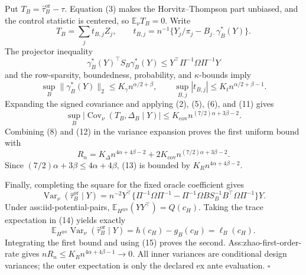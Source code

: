 Put \(T_B=\widehat\tau_B^{\mathrm{or}}-\tau\).  Equation (3) makes the Horvitz--Thompson part unbiased, and the control statistic is centered, so \(\mathbb E_\nu T_B=0\).  Write
\[
T_B=\sum_jt_{B,j}Z_j,
\qquad
t_{B,j}=n^{-1}\{Y_j/\pi_j-B_{j\cdot}\gamma_B^*(Y)\}.
\tag{9}
\]
The projector inequality
\[
\gamma_B^*(Y)^\top S_B\gamma_B^*(Y)
\le Y^\top\Pi^{-1}\Omega\Pi^{-1}Y
\tag{10}
\]
and the row-sparsity, boundedness, probability, and \(\kappa\)-bounds imply
\[
\sup_B\lVert\gamma_B^*(Y)\rVert_2\le K_\gamma n^{\alpha/2+\beta},
\qquad
\sup_{B,j}|t_{B,j}|\le K_tn^{\alpha/2+\beta-1}.
\tag{11}
\]
Expanding the signed covariance and applying (2), (5), (6), and (11) gives
\[
\sup_B|\operatorname{Cov}_\nu(T_B,\Delta_B\mid Y)|
\le K_{\mathrm{cov}}n^{(7/2)\alpha+3\beta-2}.
\tag{12}
\]
Combining (8) and (12) in the variance expansion proves the first uniform bound with
\[
R_n=K_\Delta n^{4\alpha+4\beta-2}
+2K_{\mathrm{cov}}n^{(7/2)\alpha+3\beta-2}.
\tag{13}
\]
Since \((7/2)\alpha+3\beta\le4\alpha+4\beta\), (13) is bounded by \(K_Rn^{4\alpha+4\beta-2}\).

Finally, completing the square for the fixed oracle coefficient gives
\[
\operatorname{Var}_\nu(\widehat\tau_B^{\mathrm{or}}\mid Y)
=n^{-2}Y^\top\{\Pi^{-1}\Omega\Pi^{-1}
-\Pi^{-1}\Omega BS_B^{-1}B^\top\Omega\Pi^{-1}\}Y.
\tag{14}
\]
Under ass:iid-potential-pairs, \(\mathbb E_{H^{\otimes n}}(YY^\top)=Q(c_H)\).  Taking the trace expectation in (14) yields exactly
\[
\mathbb E_{H^{\otimes n}}\operatorname{Var}_\nu
(\widehat\tau_B^{\mathrm{or}}\mid Y)=h(c_H)-g_B(c_H)=\ell_B(c_H).
\tag{15}
\]
Integrating the first bound and using (15) proves the second.  Ass:zhao-first-order-rate gives \(nR_n\le K_Rn^{4\alpha+4\beta-1}\to0\).  All inner variances are conditional design variances; the outer expectation is only the declared ex ante evaluation. \(\square\)